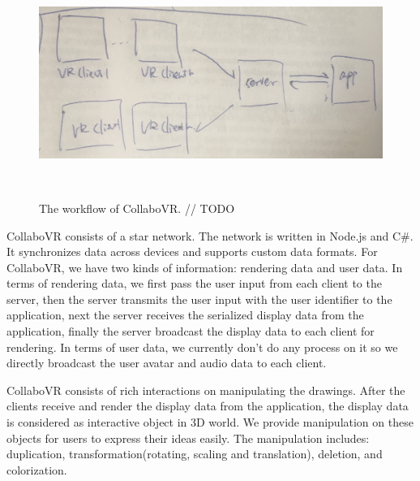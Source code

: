 \documentclass{sigchi}
\begin{document}
\begin{figure}[ht!]
 \centering
 \includegraphics[width=1.75\columnwidth]{workflow}
 \caption{The workflow of CollaboVR.
 // TODO
 }~\label{fig:workflow}
\end{figure}

CollaboVR consists of a star network. The network is written in Node.js and C\#. It synchronizes data across devices and supports custom data formats. For CollaboVR, we have two kinds of information: rendering data and user data. In terms of rendering data, we first pass the user input from each client to the server, then the server transmits the user input with the user identifier to the application, next the server receives the serialized display data from the application, finally the server broadcast the display data to each client for rendering. In terms of user data, we currently don't do any process on it so we directly broadcast the user avatar and audio data to each client.

CollaboVR consists of rich interactions on manipulating the drawings. After the clients receive and render the display data from the application, the display data is considered as interactive object in 3D world. We provide manipulation on these objects for users to express their ideas easily. The manipulation includes: duplication, transformation(rotating, scaling and translation), deletion, and colorization.
\end{document}
